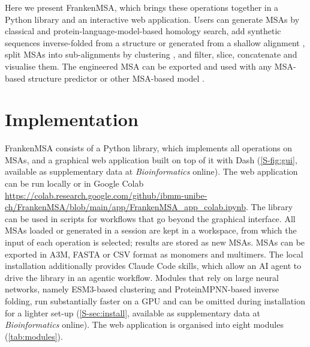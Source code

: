 \documentclass[webpdf,contemporary,large]{oup-authoring-template}%
\newcommand{\suppl}{available as supplementary data at \textit{Bioinformatics} online}
\begin{document}
Here we present FrankenMSA, which brings these operations together in a Python library and an interactive web application. Users can generate MSAs by classical \cite{mmseqs2,colabfold} and protein-language-model-based \cite{plmsearch} homology search, add synthetic sequences inverse-folded from a structure \cite{proteinmpnn,inverse_folding} or generated from a shallow alignment \cite{ghostfold}, split MSAs into sub-alignments by clustering \cite{af2_cluster,italian_clustering}, and filter, slice, concatenate and visualise them. The engineered MSA can be exported and used with any MSA-based structure predictor \cite{alphafold2,alphafold3,chai,rosettafold} or other MSA-based model \cite{mutate_everything,msa_transformer}.

\section{Implementation}

FrankenMSA consists of a Python library, which implements all operations on MSAs, and a graphical web application built on top of it with Dash \cite{dash} (\autoref{S-fig:gui}, \suppl).
The web application can be run locally or in Google Colab \url{https://colab.research.google.com/github/ibmm-unibe-ch/FrankenMSA/blob/main/app/FrankenMSA_app_colab.ipynb}.
The library can be used in scripts for workflows that go beyond the graphical interface.
All MSAs loaded or generated in a session are kept in a workspace, from which the input of each operation is selected; results are stored as new MSAs. MSAs can be exported in A3M, FASTA or CSV format as monomers and multimers.
The local installation additionally provides Claude Code skills, which allow an AI agent to drive the library in an agentic workflow.
Modules that rely on large neural networks, namely ESM3-based clustering and ProteinMPNN-based inverse folding, run substantially faster on a GPU and can be omitted during installation for a lighter set-up (\autoref{S-sec:install}, \suppl).
The web application is organised into eight modules (\autoref{tab:modules}).
\end{document}
